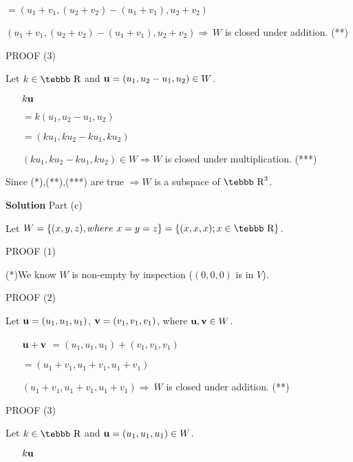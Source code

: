 \begin{enumerate}
\begin{enumerate}
$=(u_{1}+v_{1}, (u_{2}+v_{2})-(u_1+v_1),u_{2}+v_{2})$

$(u_{1}+v_{1}, (u_{2}+v_{2})-(u_1+v_1),u_{2}+v_{2})\Rightarrow\ W$
is closed under addition. (**)

\end{enumerate}

\noindent PROOF ($3$)

\noindent Let $k\in\mbox{\tebbb R}$ and ${\bf
u}=(u_{1},u_{2}-u_1,u_{2})\in W$.

\begin{enumerate} \item[$k{\bf u}$]

$=k(u_{1},u_{2}-u_1,u_{2})$

$=(ku_{1},ku_{2}-ku_1,ku_{2})$

$(ku_{1},ku_{2}-ku_1,ku_{2})\in W \Rightarrow W$ is closed under
multiplication. (***)

\end{enumerate}

\noindent Since (*),(**),(***) are true $\Rightarrow W$ is a
subspace of $\mbox{\tebbb R}^3$.

\smallskip

\noindent \textbf{Solution} Part (c)

\noindent Let $W=\{(x,y,z), where\ x=y=z\}=\{(x,x,x);
x\in\mbox{\tebbb R}\}$.

\noindent PROOF ($1$)

\noindent (*)We know $W$ is non-empty by inspection ($(0,0,0)$ is
in $V$).

\noindent PROOF ($2$)

\noindent Let ${\bf u}=(u_{1},u_{1},u_{1})$, ${\bf
v}=(v_{1},v_{1},v_{1})$, where ${\bf u},{\bf v}\in W$.

\begin{enumerate} \item[${\bf u}+{\bf v}$]
$=(u_{1},u_{1},u_{1})+(v_{1},v_{1},v_{1})$

$=(u_{1}+v_{1},u_{1}+v_{1},u_{1}+v_{1})$

$(u_{1}+v_{1},u_{1}+v_{1},u_{1}+v_{1}) \Rightarrow\ W$ is closed
under addition. (**)

\end{enumerate}

\noindent PROOF ($3$)

\noindent Let $k\in\mbox{\tebbb R}$ and ${\bf
u}=(u_{1},u_{1},u_{1})\in W$.

\begin{enumerate} \item[$k{\bf u}$]


\end{enumerate}
\end{enumerate}
